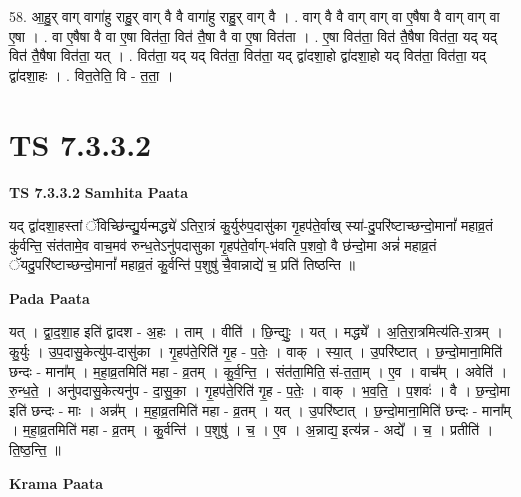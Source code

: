 \documentclass[17pt]{extarticle}
\begin{document}
58. आ॒हु॒र् वाग् वागा॑हु राहु॒र् वाग् वै वै वागा॑हु राहु॒र् वाग् वै । . वाग् वै वै वाग् वाग् वा ए॒षैषा वै वाग् वाग् वा ए॒षा । . वा ए॒षैषा वै वा ए॒षा वित॑ता॒ वित॑ तै॒षा वै वा ए॒षा वित॑ता । . ए॒षा वित॑ता॒ वित॑ तै॒षैषा वित॑ता॒ यद् यद् वित॑ तै॒षैषा वित॑ता॒ यत् । . वित॑ता॒ यद् यद् वित॑ता॒ वित॑ता॒ यद् द्वा॑दशा॒हो द्वा॑दशा॒हो यद् वित॑ता॒ वित॑ता॒ यद् द्वा॑दशा॒हः । . वित॒तेति॒ वि - त॒ता॒ । \newline
\pagebreak
{}

\section{ TS 7.3.3.2 }

\textbf{TS 7.3.3.2 } \newline
\textbf{Samhita Paata} \newline

यद् द्वा॑दशा॒हस्तां ॅविच्छि॑न्द्यु॒र्यन्मद्ध्ये॑ ऽतिरा॒त्रं कु॒र्युरु॑प॒दासु॑का गृ॒हप॑ते॒र्वाख् स्या॑-दु॒परि॑ष्टाच्छन्दो॒मानां᳚ महाव्र॒तं कु॑र्वन्ति॒ संत॑तामे॒व वाच॒मव॑ रुन्ध॒तेऽनु॑पदासुका गृ॒हप॑ते॒र्वाग्-भ॑वति प॒शवो॒ वै छ॑न्दो॒मा अन्नं॑ महाव्र॒तं ॅयदु॒परि॑ष्टाच्छन्दो॒मानां᳚ महाव्र॒तं कु॒र्वन्ति॑ प॒शुषु॑ चै॒वान्नाद्ये॑ च॒ प्रति॑ तिष्ठन्ति ॥ \newline

\textbf{Pada Paata} \newline

यत् । द्वा॒द॒शा॒ह इति॑ द्वादश - अ॒हः । ताम् । वीति॑ । छि॒न्द्युः॒ । यत् । मद्ध्ये᳚ । अ॒ति॒रा॒त्रमित्य॑ति-रा॒त्रम् । कु॒र्युः । उ॒प॒दासु॒केत्यु॑प-दासु॑का । गृ॒हप॑ते॒रिति॑ गृ॒ह - प॒तेः॒ । वाक् । स्या॒त् । उ॒परि॑ष्टात् । छ॒न्दो॒माना॒मिति॑ छन्दः - माना᳚म् । म॒हा॒व्र॒तमिति॑ महा - व्र॒तम् । कु॒र्व॒न्ति॒ । संत॑ता॒मिति॒ सं-त॒ता॒म् । ए॒व । वाच᳚म् । अवेति॑ । रु॒न्ध॒ते॒ । अनु॑पदासु॒केत्यनु॑प - दा॒सु॒का॒ । गृ॒हप॑ते॒रिति॑ गृ॒ह - प॒तेः॒ । वाक् । भ॒व॒ति॒ । प॒शवः॑ । वै । छ॒न्दो॒मा इति॑ छन्दः - माः । अन्न᳚म् । म॒हा॒व्र॒तमिति॑ महा - व्र॒तम् । यत् । उ॒परि॑ष्टात् । छ॒न्दो॒माना॒मिति॑ छन्दः - माना᳚म् । म॒हा॒व्र॒तमिति॑ महा - व्र॒तम् । कु॒र्वन्ति॑ । प॒शुषु॑ । च॒ । ए॒व । अ॒न्नाद्य॒ इत्य॑न्न - अद्ये᳚ । च॒ । प्रतीति॑ । ति॒ष्ठ॒न्ति॒ ॥  \newline


\textbf{Krama Paata} \newline
\end{document}
